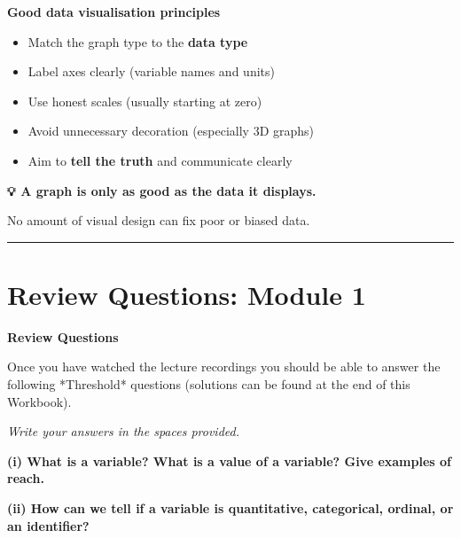 \documentclass[
  11pt,
  oneside]{scrbook}
\providecommand{\tightlist}{%
  \setlength{\itemsep}{0pt}\setlength{\parskip}{0pt}}
\begin{document}
\textbf{Good data visualisation principles}

\begin{itemize}
\tightlist
\item
  Match the graph type to the \textbf{data type}
\item
  Label axes clearly (variable names and units)
\item
  Use honest scales (usually starting at zero)
\item
  Avoid unnecessary decoration (especially 3D graphs)
\item
  Aim to \textbf{tell the truth} and communicate clearly
\end{itemize}

\begin{tipbox}
\textbf{💡 A graph is only as good as the data it displays.}

No amount of visual design can fix poor or biased data.
\end{tipbox}

\begin{center}\rule{0.5\linewidth}{0.5pt}\end{center}

\chapter*{Review Questions: Module 1}\label{review-questions-module-1}

\begin{bannerbox}
\textbf{Review Questions}

Once you have watched the lecture recordings you should be able to answer the following *Threshold* questions (solutions can be found at the end of this Workbook).
\end{bannerbox}

\textit{Write your answers in the spaces provided.}

\medskip

\textbf{(i) What is a variable? What is a value of a variable? Give examples of reach.}

\begin{answerbox}\vspace{3cm}\end{answerbox}

\textbf{(ii) How can we tell if a variable is quantitative, categorical, ordinal, or an identifier?}

\begin{answerbox}\vspace{3cm}\end{answerbox}
\end{document}
